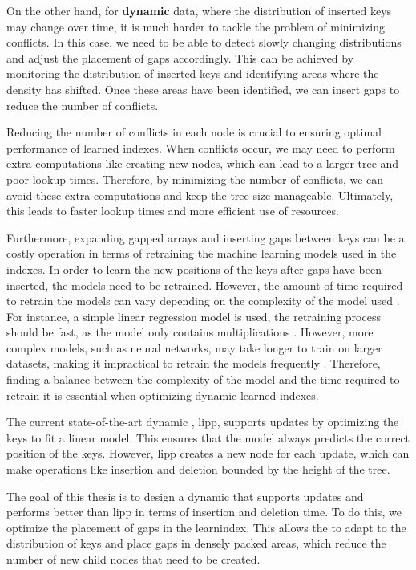 On the other hand, for \textbf{dynamic} data, where the distribution of inserted keys may change over time, it is much harder to tackle the problem of minimizing conflicts. In this case, we need to be able to detect slowly changing distributions and adjust the placement of gaps accordingly. This can be achieved by monitoring the distribution of inserted keys and identifying areas where the density has shifted. Once these areas have been identified, we can insert gaps to reduce the number of conflicts.

Reducing the number of conflicts in each node is crucial to ensuring optimal performance of learned indexes. When conflicts occur, we may need to perform extra computations like creating new nodes, which can lead to a larger tree and poor lookup times. Therefore, by minimizing the number of conflicts, we can avoid these extra computations and keep the tree size manageable. Ultimately, this leads to faster lookup times and more efficient use of resources.

Furthermore, expanding gapped arrays and inserting gaps between keys can be a costly operation in terms of retraining the machine learning models used in the indexes. In order to learn the new positions of the keys after gaps have been inserted, the models need to be retrained. However, the amount of time required to retrain the models can vary depending on the complexity of the model used \cite{CasedLearnedIndex}. For instance, a simple linear regression model is used, the retraining process should be fast, as the model only contains multiplications \cite{CasedLearnedIndex,ALEX,LIPP}. However, more complex models, such as neural networks, may take longer to train on larger datasets, making it impractical to retrain the models frequently \cite{CasedLearnedIndex}. Therefore, finding a balance between the complexity of the model and the time required to retrain it is essential when optimizing dynamic learned indexes. 



The current state-of-the-art dynamic \learnindex, \acrshort{lipp}, supports updates by optimizing the keys to fit a linear model. This ensures that the model always predicts the correct position of the keys. However,  \acrshort{lipp} creates a new node for each update, which can make operations like insertion and deletion bounded by the height of the tree.

The goal of this thesis is to design a dynamic \learnindex that supports updates and performs better than \acrshort{lipp} in terms of insertion and deletion time. To do this, we optimize the placement of gaps in the learnindex. This allows the \learnindex to adapt to the distribution of keys and place gaps in densely packed areas, which reduce the number of new child nodes that need to be created.



